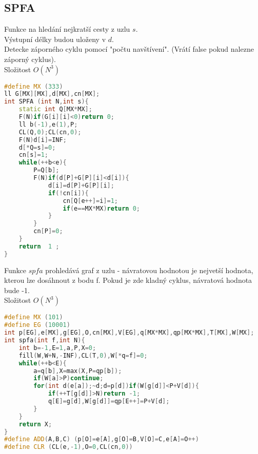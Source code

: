 \documentclass[11pt]{article}
\begin{document}
\subsection{SPFA}
Funkce na hledání nejkratší cesty z uzlu $s$.
\\Výstupní délky budou uloženy v $d$.
\\Detecke záporného cyklu pomocí "počtu navštívení". (Vrátí false pokud nalezne záporný cyklus).
\\Složitost $O(N^3)$
\begin{lstlisting}[language=C++]
#define MX (333)
ll G[MX][MX],d[MX],cn[MX];
int SPFA (int N,int s){
    static int Q[MX*MX];
    F(N)if(G[i][i]<0)return 0;
    ll b(-1),e(1),P;
    CL(Q,0);CL(cn,0);
    F(N)d[i]=INF;
    d[*Q=s]=0; 
    cn[s]=1; 
    while(++b<e){
        P=Q[b]; 
        F(N)if(d[P]+G[P][i]<d[i]){ 
            d[i]=d[P]+G[P][i];
            if(!cn[i]){ 
                cn[Q[e++]=i]=1; 
                if(e==MX*MX)return 0;
            } 
        } 
        cn[P]=0;
    } 
    return  1 ; 
}
\end{lstlisting}
Funkce $spfa$ prohledává graf z uzlu - návratovou hodnotou je nejvetší hodnota, kterou lze dosáhnout z bodu \textsf{f}. Pokud je zde kladný cyklus, návratová hodnota bude \textsf{-1}.
\\Složitost $O(N^3)$ 
\begin{lstlisting}[language=C++]
#define MX (101)
#define EG (10001)
int p[EG],e[MX],g[EG],O,cn[MX],V[EG],q[MX*MX],qp[MX*MX],T[MX],W[MX];
int spfa(int f,int N){
    int b=-1,E=1,a,P,X=0;
    fill(W,W+N,-INF),CL(T,0),W[*q=f]=0;
    while(++b<E){
        a=q[b],X=max(X,P=qp[b]);
        if(W[a]>P)continue;
        for(int d(e[a]);~d;d=p[d])if(W[g[d]]<P+V[d]){
            if(++T[g[d]]>N)return -1;
            q[E]=g[d],W[g[d]]=qp[E++]=P+V[d];
        }
    }
    return X;
}
#define ADD(A,B,C) (p[O]=e[A],g[O]=B,V[O]=C,e[A]=O++)
#define CLR (CL(e,-1),O=0,CL(cn,0))
\end{lstlisting}
\end{document}
